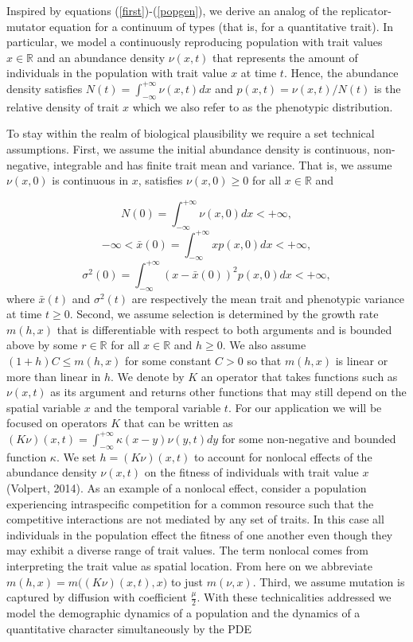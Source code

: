 \documentclass[]{elsarticle} %
\begin{document}
Inspired by equations (\ref{first})-(\ref{popgen}), we derive an analog
of the replicator-mutator equation for a continuum of types (that is,
for a quantitative trait). In particular, we model a continuously
reproducing population with trait values \(x\in\mathbb{R}\) and an
abundance density \(\nu(x,t)\) that represents the amount of individuals
in the population with trait value \(x\) at time \(t\). Hence, the
abundance density satisfies \(N(t)=\int_{-\infty}^{+\infty}\nu(x,t)dx\)
and \(p(x,t)=\nu(x,t)/N(t)\) is the relative density of trait \(x\)
which we also refer to as the phenotypic distribution.

To stay within the realm of biological plausibility we require a set
technical assumptions. First, we assume the initial abundance density is
continuous, non-negative, integrable and has finite trait mean and
variance. That is, we assume \(\nu(x,0)\) is continuous in \(x\),
satisfies \(\nu(x,0)\geq0\) for all \(x\in\mathbb{R}\) and

\begin{equation}
N(0)=\int_{-\infty}^{+\infty}\nu(x,0)dx<+\infty,
\end{equation} \begin{equation}
-\infty<\bar x(0)=\int_{-\infty}^{+\infty}xp(x,0)dx<+\infty,
\end{equation} \begin{equation}
\sigma^2(0)=\int_{-\infty}^{+\infty}(x-\bar x(0))^2p(x,0)dx<+\infty,
\end{equation} where \(\bar x(t)\) and \(\sigma^2(t)\) are respectively
the mean trait and phenotypic variance at time \(t\geq0\). Second, we
assume selection is determined by the growth rate \(m(h,x)\) that is
differentiable with respect to both arguments and is bounded above by
some \(r\in\mathbb{R}\) for all \(x\in\mathbb{R}\) and \(h\geq0\). We
also assume \((1+h)C\leq m(h,x)\) for some constant \(C>0\) so that
\(m(h,x)\) is linear or more than linear in \(h\). We denote by \(K\) an
operator that takes functions such as \(\nu(x,t)\) as its argument and
returns other functions that may still depend on the spatial variable
\(x\) and the temporal variable \(t\). For our application we will be
focused on operators \(K\) that can be written as
\((K\nu)(x,t)=\int_{-\infty}^{+\infty}\kappa(x-y)\nu(y,t)dy\) for some
non-negative and bounded function \(\kappa\). We set \(h=(K\nu)(x,t)\)
to account for nonlocal effects of the abundance density \(\nu(x,t)\) on
the fitness of individuals with trait value \(x\) (Volpert, 2014). As an
example of a nonlocal effect, consider a population experiencing
intraspecific competition for a common resource such that the
competitive interactions are not mediated by any set of traits. In this
case all individuals in the population effect the fitness of one another
even though they may exhibit a diverse range of trait values. The term
nonlocal comes from interpreting the trait value as spatial location.
From here on we abbreviate \(m(h,x)=m\big((K\nu)(x,t),x\big)\) to just
\(m(\nu,x)\). Third, we assume mutation is captured by diffusion with
coefficient \(\frac{\mu}{2}\). With these technicalities addressed we
model the demographic dynamics of a population and the dynamics of a
quantitative character simultaneously by the PDE
\end{document}

